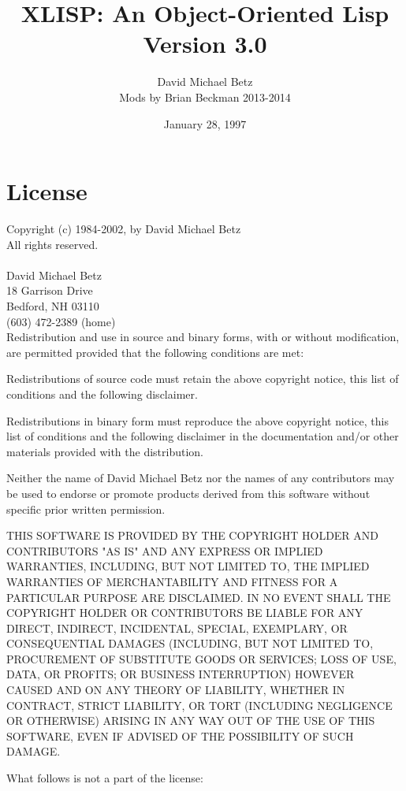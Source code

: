 \documentclass[11pt]{article}
\author{David Michael Betz\\ Mods by Brian Beckman 2013-2014}
\date{January 28, 1997}
\title{XLISP: An Object-Oriented Lisp\\ Version 3.0}
\begin{document}
\maketitle
\tableofcontents


\section{License}
\label{sec-1}

Copyright (c) 1984-2002, by David Michael Betz \\
  All rights reserved.\\
  \\
David Michael Betz \\
18 Garrison Drive \\
Bedford, NH 03110 \\
(603) 472-2389 (home)\\

Redistribution and use in source and binary forms, with or without
modification, are permitted provided that the following conditions are
met:

Redistributions of source code must retain the above copyright notice,
this list of conditions and the following disclaimer.

Redistributions in binary form must reproduce the above copyright
notice, this list of conditions and the following disclaimer in the
documentation and/or other materials provided with the distribution.

Neither the name of David Michael Betz nor the names of any
contributors may be used to endorse or promote products derived from
this software without specific prior written permission.

THIS SOFTWARE IS PROVIDED BY THE COPYRIGHT HOLDER AND CONTRIBUTORS "AS
IS" AND ANY EXPRESS OR IMPLIED WARRANTIES, INCLUDING, BUT NOT LIMITED
TO, THE IMPLIED WARRANTIES OF MERCHANTABILITY AND FITNESS FOR A
PARTICULAR PURPOSE ARE DISCLAIMED.  IN NO EVENT SHALL THE COPYRIGHT
HOLDER OR CONTRIBUTORS BE LIABLE FOR ANY DIRECT, INDIRECT, INCIDENTAL,
SPECIAL, EXEMPLARY, OR CONSEQUENTIAL DAMAGES (INCLUDING, BUT NOT
LIMITED TO, PROCUREMENT OF SUBSTITUTE GOODS OR SERVICES; LOSS OF USE,
DATA, OR PROFITS; OR BUSINESS INTERRUPTION) HOWEVER CAUSED AND ON ANY
THEORY OF LIABILITY, WHETHER IN CONTRACT, STRICT LIABILITY, OR TORT
(INCLUDING NEGLIGENCE OR OTHERWISE) ARISING IN ANY WAY OUT OF THE USE
OF THIS SOFTWARE, EVEN IF ADVISED OF THE POSSIBILITY OF SUCH DAMAGE.

What follows is not a part of the license:
\end{document}
